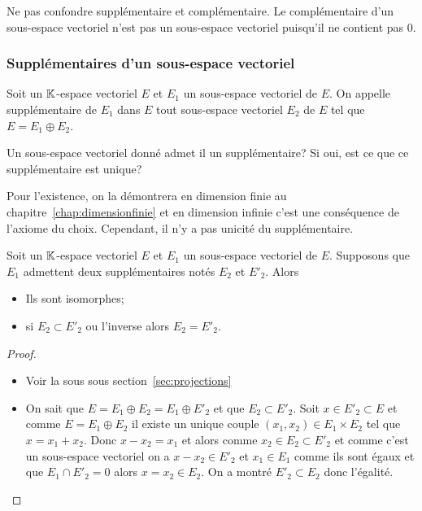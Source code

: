 Ne pas confondre supplémentaire et complémentaire. Le complémentaire d'un
sous-espace vectoriel n'est pas un sous-espace vectoriel puisqu'il ne contient
pas \(0\).

\subsubsection{Supplémentaires d'un sous-espace vectoriel}

\begin{defdef}
  Soit un \(\mathbb{K}\)-espace vectoriel \(E\) et \(E_1\) un sous-espace vectoriel de
  \(E\). On appelle supplémentaire de \(E_1\) dans \(E\) tout sous-espace
  vectoriel \(E_2\) de \(E\) tel que \(E= E_1 \oplus E_2\).
\end{defdef}

Un sous-espace vectoriel donné admet il un supplémentaire? Si oui, est ce que ce
supplémentaire est unique?

Pour l'existence, on la démontrera en dimension finie au chapitre~\ref{chap:dimensionfinie}
et en dimension infinie c'est une conséquence de l'axiome du choix.
Cependant, il n'y a pas unicité du supplémentaire.

\begin{prop}\label{prop:deuxsuppiso}
  Soit un \(\mathbb{K}\)-espace vectoriel \(E\) et \(E_1\) un sous-espace vectoriel de
  \(E\). Supposons que \(E_1\) admettent deux supplémentaires notés \(E_2\) et
  \(E'_2\). Alors
  \begin{itemize}
    \item Ils sont isomorphes;
    \item si \(E_2 \subset E'_2\) ou l'inverse alors \(E_2=E'_2\).
  \end{itemize}
\end{prop}
\begin{proof}
  \begin{itemize}
    \item Voir la sous sous section~\ref{sec:projections}
    \item On sait que \(E=E_1 \oplus E_2=E_1 \oplus E'_2\) et que \(E_2 \subset
      E'_2\). Soit \(x \in E'_2 \subset E\) et comme \(E=E_1 \oplus E_2\) il
      existe un unique couple \((x_1,x_2 ) \in E_1 \times E_2\) tel que
      \(x=x_1+x_2\). Donc \(x-x_2=x_1\) et alors comme \(x_2 \in E_2 \subset
      E'_2\) et comme c'est un sous-espace vectoriel on a \(x-x_2\in E'_2\)  et
      \(x_1 \in E_1\) comme ils sont égaux et que \(E_1 \cap E'_2=0\)  alors
      \(x=x_2 \in E_2\). On a montré \(E'_2 \subset E_2\) donc l'égalité.
  \end{itemize}
\end{proof}

